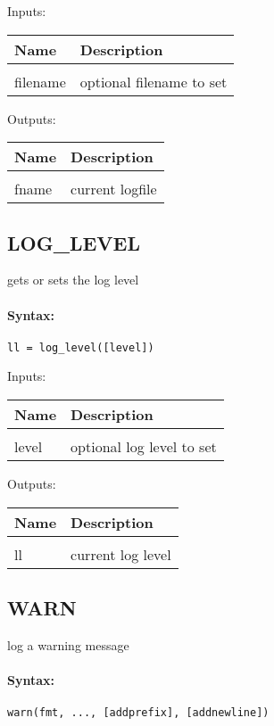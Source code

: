 Inputs:

\begin{tabular}{|l|p{5cm}|}
\hline
\textbf{Name} & \textbf{Description} \\
\hline \hline \\
filename & optional filename to set  \\ \hline
\end{tabular}
Outputs:

\begin{tabular}{|l|p{5cm}|}
\hline
\textbf{Name} & \textbf{Description} \\
\hline \hline \\
fname & current logfile  \\ \hline
\end{tabular}

\subsection{LOG\_LEVEL}

gets or sets the log level

\paragraph{Syntax:} \verb|ll = log_level([level])|

Inputs:

\begin{tabular}{|l|p{5cm}|}
\hline
\textbf{Name} & \textbf{Description} \\
\hline \hline \\
level & optional log level to set  \\ \hline
\end{tabular}
Outputs:

\begin{tabular}{|l|p{5cm}|}
\hline
\textbf{Name} & \textbf{Description} \\
\hline \hline \\
ll & current log level  \\ \hline
\end{tabular}

\subsection{WARN}

log a warning message

\paragraph{Syntax:} \verb|warn(fmt, ..., [addprefix], [addnewline])|

